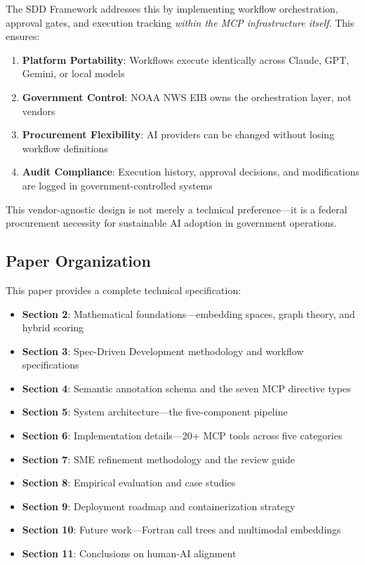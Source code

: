 \documentclass[11pt,letterpaper]{article}
\newcommand{\sdd}{\textsc{SDD}}
\begin{document}
The \sdd{} Framework addresses this by implementing workflow orchestration, approval gates, and execution tracking \textit{within the MCP infrastructure itself}. This ensures:

\begin{enumerate}
    \item \textbf{Platform Portability}: Workflows execute identically across Claude, GPT, Gemini, or local models
    \item \textbf{Government Control}: NOAA NWS EIB owns the orchestration layer, not vendors
    \item \textbf{Procurement Flexibility}: AI providers can be changed without losing workflow definitions
    \item \textbf{Audit Compliance}: Execution history, approval decisions, and modifications are logged in government-controlled systems
\end{enumerate}

This vendor-agnostic design is not merely a technical preference---it is a federal procurement necessity for sustainable AI adoption in government operations.

\subsection{Paper Organization}

This paper provides a complete technical specification:

\begin{itemize}
    \item \textbf{Section 2}: Mathematical foundations---embedding spaces, graph theory, and hybrid scoring
    \item \textbf{Section 3}: Spec-Driven Development methodology and workflow specifications
    \item \textbf{Section 4}: Semantic annotation schema and the seven MCP directive types
    \item \textbf{Section 5}: System architecture---the five-component pipeline
    \item \textbf{Section 6}: Implementation details---20+ MCP tools across five categories
    \item \textbf{Section 7}: SME refinement methodology and the review guide
    \item \textbf{Section 8}: Empirical evaluation and case studies
    \item \textbf{Section 9}: Deployment roadmap and containerization strategy
    \item \textbf{Section 10}: Future work---Fortran call trees and multimodal embeddings
    \item \textbf{Section 11}: Conclusions on human-AI alignment
\end{itemize}
\end{document}
